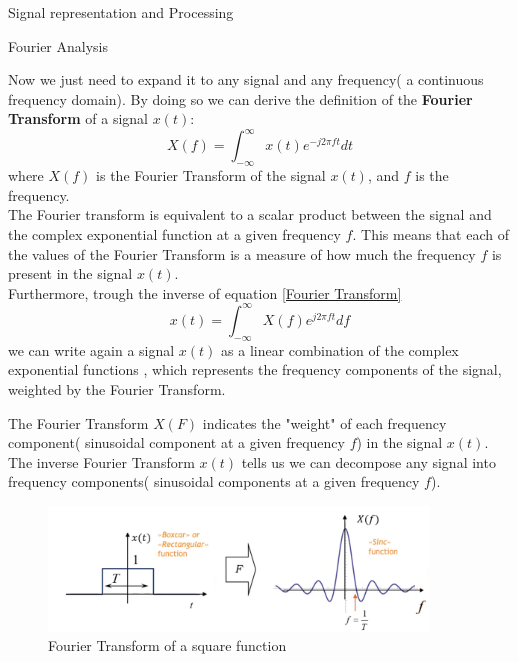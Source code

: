 \begin{section}{Signal representation and Processing}
\begin{subsection}{Fourier Analysis}
\begin{boxH}
    \end{boxH}
    Now we just need to expand it to any signal and any frequency( a continuous frequency domain).
    By doing so we can derive the definition of the \textbf{Fourier Transform} of a signal $x(t)$:
    \begin{equation}
      X(f) = \int_{-\infty}^{\infty} x(t) e^{-j2\pi ft} dt
      \label{Fourier Transform}
    \end{equation}
    where $X(f)$ is the Fourier Transform of the signal $x(t)$, and $f$ is the frequency.\\
    The Fourier transform is equivalent to a scalar product between the signal and the complex
    exponential function at a given frequency $f$. This means that each of the values of the
    Fourier Transform is a measure of how much the frequency $f$ is present in the signal $x(t)$.\\
    Furthermore, trough the inverse of equation \ref{Fourier Transform}
    \begin{equation}
      x(t) = \int_{-\infty}^{\infty} X(f) e^{j2\pi ft} df
      \label{Inverse Fourier Transform}
    \end{equation}
    we can write again a signal $x(t)$ as a linear combination of the complex exponential functions
    , which represents the frequency components of the signal, weighted by the Fourier Transform.\\
      
    \begin{boxH}
      The Fourier Transform $X(F)$ indicates the "weight" of each frequency component( sinusoidal
      component at a given frequency $f$) in the signal $x(t)$.\\
      The inverse Fourier Transform $x(t)$ tells us we can decompose any signal into frequency 
      components( sinusoidal components at a given frequency $f$).
    \end{boxH}
    
    \begin{figure}[h]
      \centering
      \includegraphics[width=0.9\textwidth]{img/wireless/fourier square function.png}
      \caption{Fourier Transform of a square function}
      \label{fig:Fourier Transform}
    \end{figure}


\end{subsection}
\end{section}
